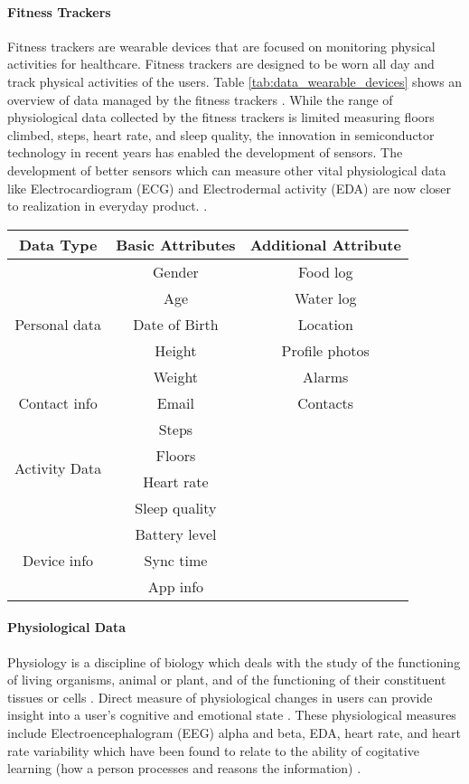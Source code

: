 \paragraph{Fitness Trackers}
Fitness trackers are wearable devices that are focused on monitoring physical activities for healthcare. Fitness trackers are designed to be worn all day and track physical activities of the users. Table \ref{tab:data_wearable_devices} shows an overview of data managed by the fitness trackers \cite{mendoza_assessment_2018}. While the range of physiological data collected by the fitness trackers is limited measuring floors climbed, steps, heart rate, and sleep quality, the innovation in semiconductor technology in recent years has enabled the development of sensors. The development of better sensors which can measure other vital physiological data like Electrocardiogram (ECG) and Electrodermal activity (EDA) are now closer to realization in everyday product. \cite{haghi_wearable_2017}. 

\begin{center}
\begin{tabular}{ |c|c|c| }
\hline
Data Type & Basic Attributes & Additional Attribute \\
\hline
\multirow{5}{8em}{Personal data} & Gender & Food log \\ 
& Age & Water log \\ 
& Date of Birth & Location \\ 
& Height & Profile photos \\ 
& Weight & Alarms \\ 
\hline
\multirow{1}{8em}{Contact info} & Email & Contacts \\
\hline
\multirow{4}{8em}{Activity Data} & Steps &  \\
& Floors & \\
& Heart rate & \\
& Sleep quality & \\
\hline
\multirow{3}{8em}{Device info} & Battery level & \\
& Sync time & \\
& App info & \\
\hline
\end{tabular}
\label{tab:data_wearable_devices}
\end{center}

 \paragraph{Physiological Data} Physiology is a discipline of biology which deals with the study of the functioning of living organisms, animal or plant, and of the functioning of their constituent tissues or cells \cite{scheer_physiology_nodate}. Direct measure of physiological changes in users can provide insight into a user's cognitive and emotional state \cite{benbasat_incorporating_nodate}. These physiological measures include Electroencephalogram (EEG) alpha and beta, EDA, heart rate, and heart rate variability which have been found to relate to the ability of cogitative learning (how a person processes and reasons the information) \cite{leger_neurophysiological_2014}.
 
